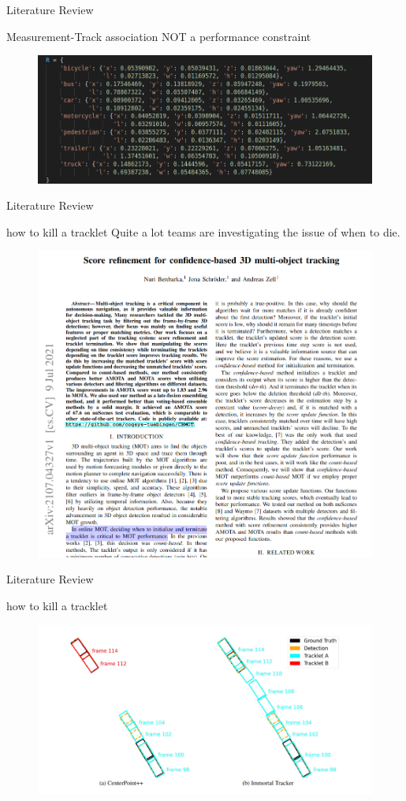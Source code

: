 \documentclass[aspectratio=169,xcolor=dvipsnames]{beamer}
\begin{document}
\begin{frame}{Literature Review}
\begin{block}{Measurement-Track association NOT a performance constraint}
    \begin{figure}
    \includegraphics[width=0.9\linewidth]{DA/4.png}
    \end{figure}
\end{block}
\end{frame}

\begin{frame}{Literature Review}
\begin{block}{how to kill a tracklet}
    Quite a lot teams are investigating the issue of when to die.
    \begin{figure}
    \includegraphics[width=0.4\linewidth]{termination/1.png}
    \end{figure}
\end{block}
\end{frame}

\begin{frame}{Literature Review}
\begin{block}{how to kill a tracklet}
    
    \begin{figure}
    \includegraphics[width=0.9\linewidth]{termination/2.png}
    \end{figure}
\end{block}
\end{frame}
\end{document}
